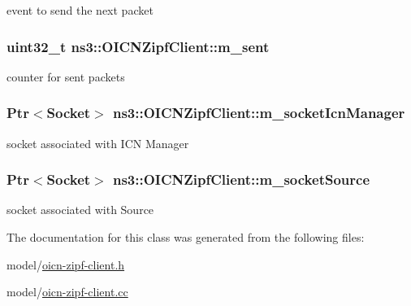 event to send the next packet 

\hypertarget{classns3_1_1OICNZipfClient_ad8cd34cc29d9ff89702f5c805a58aaf4}{
\subsubsection[{m\-\_\-sent}]{\setlength{\rightskip}{0pt plus 5cm}uint32\-\_\-t ns3\-::\-O\-I\-C\-N\-Zipf\-Client\-::m\-\_\-sent\hspace{0.3cm}{\ttfamily [private]}}}\label{classns3_1_1OICNZipfClient_ad8cd34cc29d9ff89702f5c805a58aaf4}


counter for sent packets 

\hypertarget{classns3_1_1OICNZipfClient_accb08afc8f8218076eaa919743381e79}{
\subsubsection[{m\-\_\-socket\-Icn\-Manager}]{\setlength{\rightskip}{0pt plus 5cm}Ptr$<$Socket$>$ ns3\-::\-O\-I\-C\-N\-Zipf\-Client\-::m\-\_\-socket\-Icn\-Manager\hspace{0.3cm}{\ttfamily [private]}}}\label{classns3_1_1OICNZipfClient_accb08afc8f8218076eaa919743381e79}


socket associated with I\-C\-N Manager 

\hypertarget{classns3_1_1OICNZipfClient_ada2f1cccaed0a70bf548ad789669a2f6}{
\subsubsection[{m\-\_\-socket\-Source}]{\setlength{\rightskip}{0pt plus 5cm}Ptr$<$Socket$>$ ns3\-::\-O\-I\-C\-N\-Zipf\-Client\-::m\-\_\-socket\-Source\hspace{0.3cm}{\ttfamily [private]}}}\label{classns3_1_1OICNZipfClient_ada2f1cccaed0a70bf548ad789669a2f6}


socket associated with Source 



The documentation for this class was generated from the following files\-:\begin{DoxyCompactItemize}
\item 
model/\hyperlink{oicn-zipf-client_8h}{oicn-\/zipf-\/client.\-h}\item 
model/\hyperlink{oicn-zipf-client_8cc}{oicn-\/zipf-\/client.\-cc}\end{DoxyCompactItemize}
